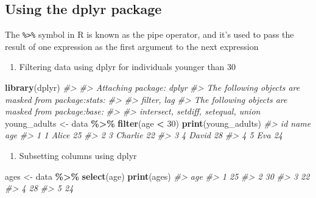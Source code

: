 \documentclass[
]{book}
\newenvironment{Shaded}{\begin{snugshade}}{\end{snugshade}}
\newcommand{\CommentTok}[1]{\textcolor[rgb]{0.56,0.35,0.01}{\textit{#1}}}
\newcommand{\DecValTok}[1]{\textcolor[rgb]{0.00,0.00,0.81}{#1}}
\newcommand{\FunctionTok}[1]{\textcolor[rgb]{0.13,0.29,0.53}{\textbf{#1}}}
\newcommand{\NormalTok}[1]{#1}
\newcommand{\OtherTok}[1]{\textcolor[rgb]{0.56,0.35,0.01}{#1}}
\newcommand{\SpecialCharTok}[1]{\textcolor[rgb]{0.81,0.36,0.00}{\textbf{#1}}}
\providecommand{\tightlist}{%
  \setlength{\itemsep}{0pt}\setlength{\parskip}{0pt}}
\begin{document}
\subsection*{Using the dplyr package}\label{using-the-dplyr-package}

The \texttt{\%\textgreater{}\%} symbol in R is known as the pipe operator, and it's used to pass the result of one expression as the first argument to the next expression

\begin{enumerate}
\def\labelenumi{\arabic{enumi}.}
\tightlist
\item
  Filtering data using dplyr for individuals younger than 30
\end{enumerate}

\begin{Shaded}
\begin{Highlighting}[]
\FunctionTok{library}\NormalTok{(dplyr)}
\CommentTok{\#\textgreater{} }
\CommentTok{\#\textgreater{} Attaching package: \textquotesingle{}dplyr\textquotesingle{}}
\CommentTok{\#\textgreater{} The following objects are masked from \textquotesingle{}package:stats\textquotesingle{}:}
\CommentTok{\#\textgreater{} }
\CommentTok{\#\textgreater{}     filter, lag}
\CommentTok{\#\textgreater{} The following objects are masked from \textquotesingle{}package:base\textquotesingle{}:}
\CommentTok{\#\textgreater{} }
\CommentTok{\#\textgreater{}     intersect, setdiff, setequal, union}
\NormalTok{young\_adults }\OtherTok{\textless{}{-}}\NormalTok{ data }\SpecialCharTok{\%\textgreater{}\%} \FunctionTok{filter}\NormalTok{(age }\SpecialCharTok{\textless{}} \DecValTok{30}\NormalTok{)}
\FunctionTok{print}\NormalTok{(young\_adults)}
\CommentTok{\#\textgreater{}   id    name age}
\CommentTok{\#\textgreater{} 1  1   Alice  25}
\CommentTok{\#\textgreater{} 2  3 Charlie  22}
\CommentTok{\#\textgreater{} 3  4   David  28}
\CommentTok{\#\textgreater{} 4  5     Eva  24}
\end{Highlighting}
\end{Shaded}

\begin{enumerate}
\def\labelenumi{\arabic{enumi}.}
\setcounter{enumi}{1}
\tightlist
\item
  Subsetting columns using dplyr
\end{enumerate}

\begin{Shaded}
\begin{Highlighting}[]
\NormalTok{ages }\OtherTok{\textless{}{-}}\NormalTok{ data }\SpecialCharTok{\%\textgreater{}\%} \FunctionTok{select}\NormalTok{(age)}
\FunctionTok{print}\NormalTok{(ages)}
\CommentTok{\#\textgreater{}   age}
\CommentTok{\#\textgreater{} 1  25}
\CommentTok{\#\textgreater{} 2  30}
\CommentTok{\#\textgreater{} 3  22}
\CommentTok{\#\textgreater{} 4  28}
\CommentTok{\#\textgreater{} 5  24}
\end{Highlighting}
\end{Shaded}
\end{document}
